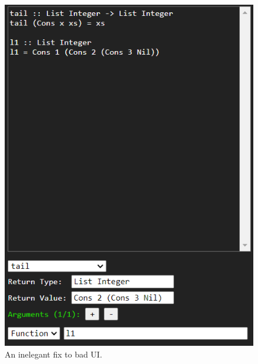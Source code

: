 \begin{figure}
    \centering
    \includegraphics[width=0.9\linewidth]{chapters/5-implementation/images/awkward.png}
    \caption{An inelegant fix to bad UI.}
    \label{fig:awkward}
\end{figure}